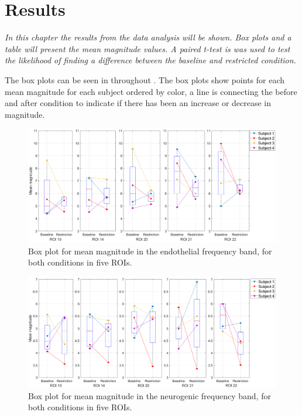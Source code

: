 \chapter{Results}
\textit{In this chapter the results from the data analysis will be shown. Box plots and a table will present the mean magnitude values. A paired t-test is was used to test the likelihood of finding a difference between the baseline and restricted condition.}

The box plots can be seen in  throughout . The box plots show points for each mean magnitude for each subject ordered by color, a line is connecting the before and after condition to indicate if there has been an increase or decrease in magnitude. 

\begin{figure}[H]
	\includegraphics[width=1\textwidth]{figures/boxplot_endo}
	\caption{Box plot for mean magnitude in the endothelial frequency band, for both conditions in five ROIs.}
	\label{fig:boxEndo}
\end{figure}

\begin{figure}[H]
	\includegraphics[width=1\textwidth]{figures/boxplot_neuro}
	\caption{Box plot for mean magnitude in the neurogenic frequency band, for both conditions in five ROIs.}
	\label{fig:boxNeuro}
\end{figure}

